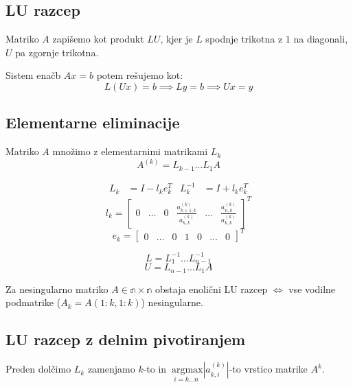 \begin{multicols}{4}
\section{LU razcep}
Matriko $A$ zapišemo kot produkt $LU$, kjer je $L$ spodnje trikotna z $1$ na diagonali, $U$ pa zgornje trikotna.

Sistem enačb $Ax = b$ potem rešujemo kot:
\[L(Ux) = b \implies Ly = b \implies Ux = y\]

\subsection{Elementarne eliminacije}
Matriko $A$ množimo z elementarnimi matrikami $L_k$
\[ A^{(k)} = L_{k-1} \dots L_1 A\]

\begin{align*}
	L_k &= I - l_k e_k^T & L_k^{-1} &= I + l_k e_k^T
\end{align*}
\[ l_k = \begin{bmatrix}
	0 &
	\dots &
	0 &
	\frac{a^{(k)}_{k+1, k}}{a^{(k)}_{k, k}} &
	\dots &
	\frac{a^{(k)}_{n, k}}{a^{(k)}_{k, k}}
\end{bmatrix}^T \]
\[ e_k = \begin{bmatrix}
	0 &
	\dots &
	0 &
	1 &
	0 &
	\dots &
	0
\end{bmatrix}^T \]

\[L = L_1^{-1} \dots L_{n-1}^{-1}\]
\[U = L_{n-1} \dots L_1 A\]

Za nesingularno matriko $A \in \mathbb{n\times n}$ obstaja enolični LU razcep $\iff$ vse vodilne podmatrike ($A_k = A(1:k, 1:k)$) nesingularne.

\subsection{LU razcep z delnim pivotiranjem}
Preden dolčimo $L_k$ zamenjamo $k$-to in $\underset{i=k \dots n}{\ \mathrm{argmax}} |a^{(k)}_{k,i}|$-to vrstico matrike $A^{k}$.


\end{multicols}
